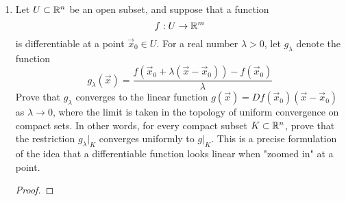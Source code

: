 \documentclass[../psets.tex]{subfiles}
\begin{document}
\begin{enumerate}
\begin{enumerate}
\begin{proof}
        \end{proof}
    \end{enumerate}
    \item Let $U\subset\mathbb{R}^n$ be an open subset, and suppose that a function
    \begin{equation*}
        f:U\to\mathbb{R}^m
    \end{equation*}
    is differentiable at a point $\vec{x}_0\in U$. For a real number $\lambda>0$, let $g_\lambda$ denote the function
    \begin{equation*}
        g_\lambda(\vec{x}) = \frac{f(\vec{x}_0+\lambda(\vec{x}-\vec{x}_0))-f(\vec{x}_0)}{\lambda}
    \end{equation*}
    Prove that $g_\lambda$ converges to the linear function $g(\vec{x})=Df(\vec{x}_0)(\vec{x}-\vec{x}_0)$ as $\lambda\to 0$, where the limit is taken in the topology of uniform convergence on compact sets. In other words, for every compact subset $K\subset\mathbb{R}^n$, prove that the restriction $g_\lambda|_K$ converges uniformly to $g|_K$. This is a precise formulation of the idea that a differentiable function looks linear when "zoomed in" at a point.
    \begin{proof}






\end{proof}
\end{enumerate}
\end{document}
